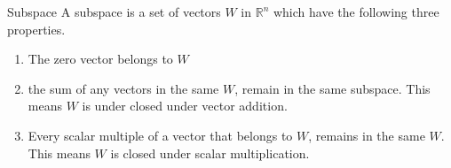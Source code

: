 \begin{definition}{Subspace}
A subspace is a set of vectors $W$ in $\mathbb{R}^n$ which have the following three properties. 

\begin{enumerate}
    \item The zero vector belongs to $W$\\
    \item the sum of any vectors in the same $W$, remain in the same subspace. This means $W$ is under closed under vector addition.
    \item Every scalar multiple of a vector that belongs to $W$, remains in the same $W$. This means $W$ is closed under scalar multiplication.
\end{enumerate}
\cite[227]{LiAl}
\label{exa:SubspaceDef}
\end{definition}
